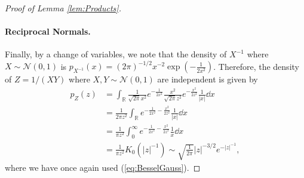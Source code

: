 \documentclass[thesis.tex]{subfiles}
\begin{document}
\begin{proof}[Proof of Lemma \ref{lem:Products}]
\paragraph{Reciprocal Normals.} Finally, by a change of variables, we note that the density of $X^{-1}$ where $X \sim \mathcal{N}(0,1)$ is $p_{X^{-1}}(x) = (2\pi)^{-1/2} x^{-2}\exp(-\frac{1}{2x^2})$. Therefore, the density of $Z = 1/(XY)$ where $X,Y \sim \mathcal{N}(0,1)$ are independent is given by
\begin{align*}
p_{Z}(z)&=\int_{\mathbb{R}}\frac{1}{\sqrt{2\pi}x^{2}}e^{-\frac{1}{2x^{2}}}\frac{x^{2}}{\sqrt{2\pi}z^{2}}e^{-\frac{x^{2}}{2z^{2}}}\frac{1}{\left|x\right|}\dd x\\
&=\frac{1}{2\pi z^{2}}\int_{\mathbb{R}}e^{-\frac{1}{2x^{2}}-\frac{x^{2}}{2z^{2}}}\frac{1}{\left|x\right|}\dd x\\
&=\frac{1}{\pi z^{2}}\int_{0}^{\infty}e^{-\frac{1}{2x^{2}}-\frac{x^{2}}{2z^{2}}}\frac{1}{x}\dd x\\
&=\frac{1}{\pi z^{2}}K_{0}(|z|^{-1}) \sim \sqrt{\frac{1}{2\pi}}|z|^{-3/2}e^{-|z|^{-1}},
\end{align*}
where we have once again used (\ref{eq:BesselGauss}). 
\end{proof}

\end{document}
